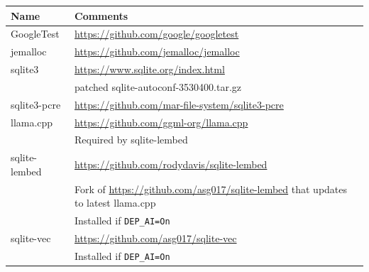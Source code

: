 \begin{center}
\begin{tabularx}{\textwidth}{| l | X |}
  \hline
  Name & Comments \\
  \hline
  GoogleTest & \url{https://github.com/google/googletest} \\
  \hline
  jemalloc & \url{https://github.com/jemalloc/jemalloc} \\
  \hline
  sqlite3 & \url{https://www.sqlite.org/index.html} \\
  & patched sqlite-autoconf-3530400.tar.gz \\
  \hline
  sqlite3-pcre & \url{https://github.com/mar-file-system/sqlite3-pcre} \\
  \hline
  llama.cpp & \url{https://github.com/ggml-org/llama.cpp} \\
  & Required by sqlite-lembed \\
  \hline
  sqlite-lembed & \url{https://github.com/rodydavis/sqlite-lembed} \\
  & Fork of \url{https://github.com/asg017/sqlite-lembed} that updates to latest llama.cpp \\
  & Installed if \texttt{DEP\_AI=On} \\
  \hline
  sqlite-vec & \url{https://github.com/asg017/sqlite-vec} \\
  & Installed if \texttt{DEP\_AI=On} \\
  \hline
\end{tabularx}
\end{center}
